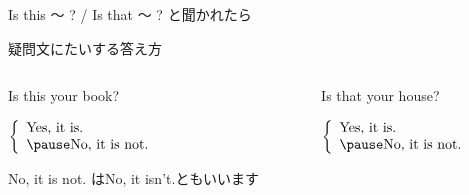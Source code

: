 \documentclass[aspectratio=169]{beamer}
\begin{document}
\begin{frame}[plain]{Is this  〜 ? / Is that 〜 ? と聞かれたら}
 \Large

疑問文にたいする答え方
\vspace{10pt}

\pause

\begin{columns}
\begin{column}{.475\textwidth}
Is this  your book?

\pause

\mbox{}\hspace{40pt}$\left\{\begin{array}{l}
         \text{Yes, it is.}\\\pause
         \text{No, it is not.}
        \end{array}\right.$

\pause

\mbox{}\hfill{}{\footnotesize No, it is not. はNo, it isn't.ともいいます}
\end{column}
\pause
\begin{column}{.475\textwidth}
Is that your house?

\pause

\mbox{}\hspace{40pt}$\left\{\begin{array}{l}
         \text{Yes, it is.}\\\pause
         \text{No, it is not.}
        \end{array}\right.$

\end{column}
\end{columns}

  \end{frame}
\end{document}
